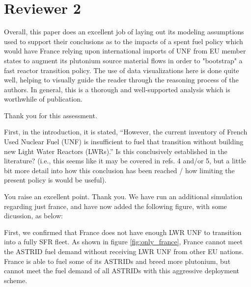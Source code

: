 \documentclass[answers,11pt]{exam}
\begin{document}
\begin{questions}
\begin{solution}
        \end{solution}


        \section*{Reviewer 2}


        \question Overall, this paper does an excellent job of laying out its 
        modeling assumptions used to support their conclusions as to the 
        impacts of a spent fuel policy which would have France relying upon 
        international imports of UNF from EU member states to augment its 
        plutonium source material flows in order to "bootstrap" a fast reactor 
        transition policy. The use of data visualizations here is done quite 
        well, helping to visually guide the reader through the reasoning 
        process of the authors. In general, this is a thorough and 
        well-supported analysis which is worthwhile of publication.


        \begin{solution}
		Thank you for this assessment.
        \end{solution}

        \question First, in the introduction, it is stated, ``However, the 
        current inventory of French Used Nuclear Fuel (UNF) is insufficient to 
        fuel that transition without building new Light Water Reactors 
        (LWRs).''
        Is this conclusively established in the literature? (i.e., this seems 
        like it may be covered in refs. 4 and/or 5, but a little bit more 
        detail into how this conclusion has been reached / how limiting the 
        present policy is would be useful).
        \begin{solution}
                You raise an excellent point. Thank you. We have run an 
                additional simulation regarding just france, and have now added 
                the following figure, with some dicussion, as below:



First, we confirmed that France does not have enough
\gls{LWR} \gls{UNF} to transition into a fully \gls{SFR}
fleet. As shown in figure \ref{fig:only_france}, France
cannot meet the \gls{ASTRID} fuel demand without receiving
\gls{LWR} \gls{UNF} from other \gls{EU} nations. France
is able to fuel some of its \glspl{ASTRID} and breed more
plutonium, but cannot meet the fuel demand of
all \glspl{ASTRID} with this aggressive deployment scheme.



\end{solution}
\end{questions}
\end{document}

